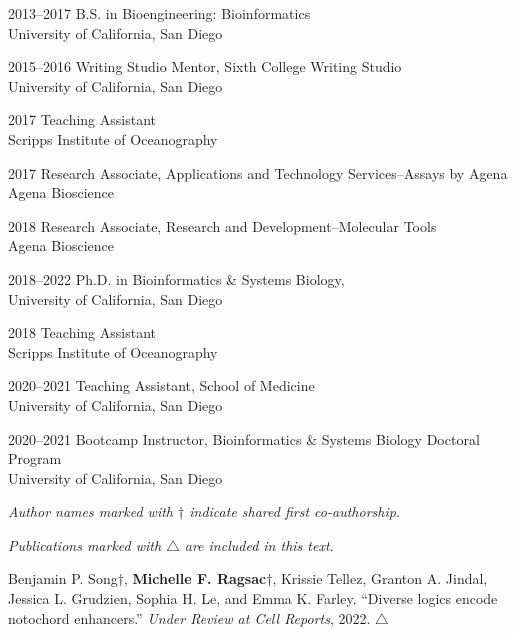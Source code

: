 \documentclass[11pt]{formatting-template}
\begin{document}
\begin{vita}
\noindent
\begin{cv}{}
\begin{cvlist}{}
	\item[2013--2017] B.S. in Bioengineering: Bioinformatics\\
		University of California, San Diego
	\item[2015--2016] Writing Studio Mentor, Sixth College Writing Studio\\
		University of California, San Diego
	\item[2017] Teaching Assistant\\Scripps Institute of Oceanography 
	\item[2017] Research Associate, Applications and Technology Services--Assays by Agena\\
		Agena Bioscience
	\item[2018] Research Associate, Research and Development--Molecular Tools\\
		Agena Bioscience 
	\item[2018--2022] Ph.D. in Bioinformatics \& Systems Biology,\\
		University of California, San Diego
	\item[2018] Teaching Assistant\\
		Scripps Institute of Oceanography
	\item[2020--2021] Teaching Assistant, School of Medicine\\
		University of California, San Diego 
	\item[2020--2021] Bootcamp Instructor, Bioinformatics \& Systems Biology Doctoral Program\\
		University of California, San Diego 
\end{cvlist}
\end{cv}

\publications{}

\noindent \textit{Author names marked with $\dagger$ indicate shared first co-authorship.} 

\noindent \textit{Publications marked with $\triangle$ are included in this text.} \newline

\noindent Benjamin P. Song$\dagger$, \textbf{Michelle F. Ragsac}$\dagger$, Krissie Tellez, Granton A. Jindal, Jessica L. Grudzien, Sophia H. Le, and Emma K. Farley. ``Diverse logics encode notochord enhancers.'' \textit{Under Review at Cell Reports}, 2022. $\triangle$ \newline


\end{vita}
\end{document}
